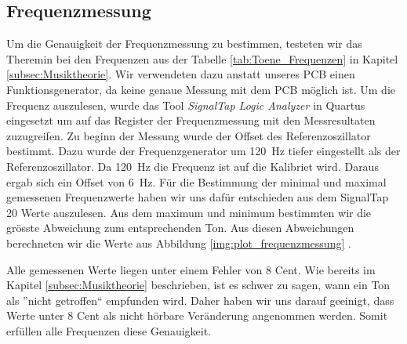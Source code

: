 \subsection{Frequenzmessung}\label{subsec:Frequenzmessung}
Um die Genauigkeit der Frequenzmessung zu bestimmen, testeten wir das Theremin bei den  Frequenzen aus der Tabelle \ref{tab:Toene_Frequenzen} in Kapitel \ref{subsec:Musiktheorie}.
 Wir verwendeten dazu anstatt unseres PCB einen Funktionsgenerator, da keine genaue Messung mit dem PCB möglich ist. Um die Frequenz auszulesen, wurde das Tool \textit{SignalTap Logic Analyzer} in Quartus eingesetzt um auf das Register der Frequenzmessung mit den Messresultaten zuzugreifen.
 Zu beginn der Messung wurde der Offset des Referenzoszillator bestimmt. Dazu wurde der Frequenzgenerator um \SI{120}{Hz} tiefer eingestellt als der Referenzoszillator. Da \SI{120}{Hz} die Frequenz ist auf die Kalibriet wird. Daraus ergab sich ein Offset von  \SI{6}{Hz}.
 Für die Bestimmung der minimal und maximal gemessenen Frequenzwerte haben wir uns dafür entschieden aus dem SignalTap 20 Werte auszulesen. Aus dem maximum und minimum bestimmten wir die grösste Abweichung zum entsprechenden Ton. Aus diesen Abweichungen berechneten wir die Werte aus Abbildung \ref{img:plot_frequenzmessung} .

 Alle gemessenen Werte liegen unter einem Fehler von 8 Cent. Wie bereits im Kapitel \ref{subsec:Musiktheorie} beschrieben, ist es schwer zu sagen, wann ein Ton als ''nicht getroffen`` empfunden wird. Daher haben wir uns darauf geeinigt, dass Werte unter 8 Cent als nicht hörbare Veränderung angenommen werden. Somit erfüllen alle Frequenzen diese Genauigkeit.
 
